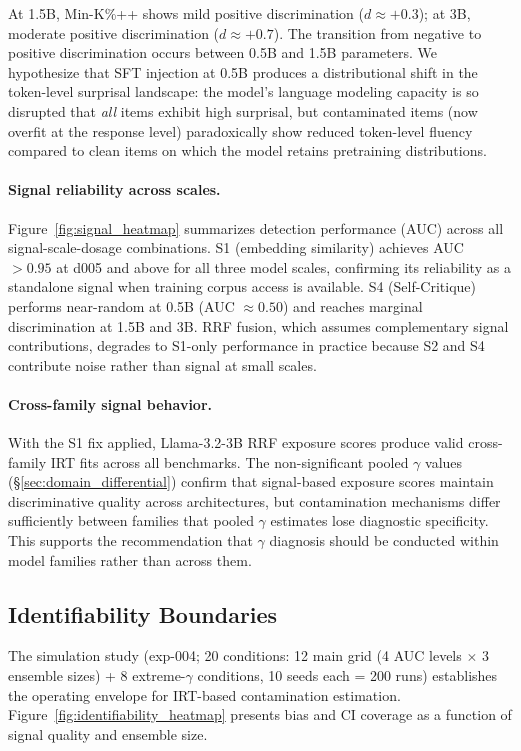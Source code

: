 At 1.5B, Min-K\%++ shows mild positive discrimination ($d \approx +0.3$); at 3B, moderate positive discrimination ($d \approx +0.7$). The transition from negative to positive discrimination occurs between 0.5B and 1.5B parameters. We hypothesize that SFT injection at 0.5B produces a distributional shift in the token-level surprisal landscape: the model's language modeling capacity is so disrupted that \textit{all} items exhibit high surprisal, but contaminated items (now overfit at the response level) paradoxically show reduced token-level fluency compared to clean items on which the model retains pretraining distributions.

\paragraph{Signal reliability across scales.}
Figure~\ref{fig:signal_heatmap} summarizes detection performance (AUC) across all signal-scale-dosage combinations. S1 (embedding similarity) achieves AUC $> 0.95$ at d005 and above for all three model scales, confirming its reliability as a standalone signal when training corpus access is available. S4 (Self-Critique) performs near-random at 0.5B (AUC $\approx 0.50$) and reaches marginal discrimination at 1.5B and 3B. RRF fusion, which assumes complementary signal contributions, degrades to S1-only performance in practice because S2 and S4 contribute noise rather than signal at small scales.

\paragraph{Cross-family signal behavior.}
With the S1 fix applied, Llama-3.2-3B RRF exposure scores produce valid cross-family IRT fits across all benchmarks. The non-significant pooled $\gamma$ values (\S\ref{sec:domain_differential}) confirm that signal-based exposure scores maintain discriminative quality across architectures, but contamination mechanisms differ sufficiently between families that pooled $\gamma$ estimates lose diagnostic specificity. This supports the recommendation that $\gamma$ diagnosis should be conducted within model families rather than across them.

\subsection{Identifiability Boundaries}
\label{sec:identifiability}

The simulation study (exp-004; 20 conditions: 12 main grid (4 AUC levels $\times$ 3 ensemble sizes) + 8 extreme-$\gamma$ conditions, 10 seeds each = 200 runs) establishes the operating envelope for IRT-based contamination estimation. Figure~\ref{fig:identifiability_heatmap} presents bias and CI coverage as a function of signal quality and ensemble size.

